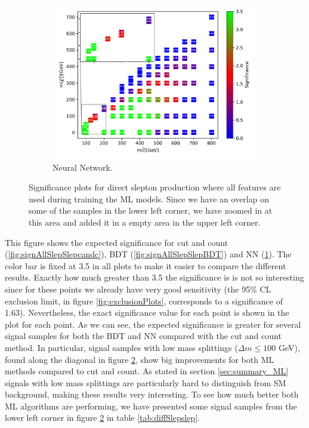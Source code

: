 \begin{figure}[H]
    \begin{subfigure}[t!]{0.49\textwidth}
    \includegraphics[width = \textwidth]{Figures/Significances/significance_NN_slepslep_All_level.pdf}
    \caption{Neural Network.}
        \label{fig:signAllSlepSlepNN}
    \end{subfigure}
    \caption{Significance plots for direct slepton production where all features are used during training the ML models. Since we have an overlap on some of the samples in the lower left corner, we have zoomed in at this area and added it in a empty area in the upper left corner.}
    \label{fig:signAllSlepSlep}
\end{figure}

This figure shows the expected significance for cut and count (\ref{fig:signAllSlepSlepcandc}), BDT (\ref{fig:signAllSlepSlepBDT}) and NN (\ref{fig:signAllSlepSlepNN}). The color bar is fixed at 3.5 in all plots to make it easier to compare the different results. Exactly how much greater than 3.5 the significance is is not so interesting since for these points we already have very good sensitivity (the 95\% CL exclusion limit, in figure \ref{fig:exclusionPlots}, corresponds to a significance of 1.63). Nevertheless, the exact significance value for each point is shown in the plot for each point. As we can see, the expected significance is greater for several signal samples for both the BDT and NN compared with the cut and count method. In particular, signal samples with low mass splittings ($\Delta m \leq 100$ GeV), found along the diagonal in figure \ref{fig:signAllSlepSlep}, show big improvements for both ML methods compared to cut and count. As stated in section \ref{sec:summary_ML} signals with low mass splittings are particularly hard to distinguish from SM background, making these results very interesting. To see how much better both ML algorithms are performing, we have presented some signal samples from the lower left corner in figure \ref{fig:signAllSlepSlep} in table \ref{tab:diffSlepslep}.

